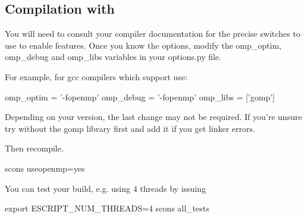 \subsection{Compilation with \openmp}
You will need to consult your compiler documentation for the precise switches to use to enable \openmp features.
Once you know the options, modify the omp_optim, omp_debug and omp_libs variables in your options.py file.

For example, for gcc compilers which support \openmp use:
\begin{shellCode}
omp_optim		= '-fopenmp'
omp_debug		= '-fopenmp'
omp_libs		= ['gomp']
\end{shellCode}
Depending on your version, the last change may not be required.
If you're unsure try without the gomp library first and add it if you get linker errors.

Then recompile.
\begin{shellCode}
 scons useopenmp=yes
\end{shellCode}

You can test your build, e.g. using 4 threads by issuing
\begin{shellCode}
export ESCRIPT_NUM_THREADS=4
scons all_tests
\end{shellCode}

